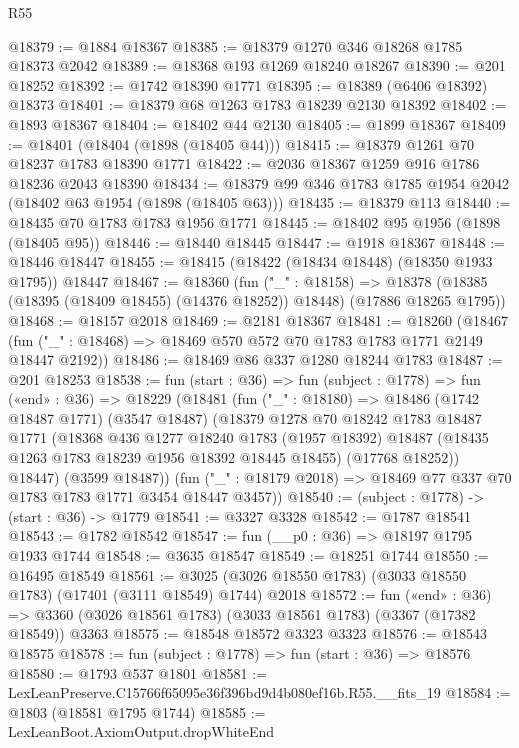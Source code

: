 \begin{lexlean}{R55}
\begin{coremodule}
@18379 := @1884 @18367
@18385 := @18379 @1270 @346 @18268 @1785 @18373 @2042
@18389 := @18368 @193 @1269 @18240 @18267
@18390 := @201 @18252
@18392 := @1742 @18390 @1771
@18395 := @18389 (@6406 @18392) @18373
@18401 := @18379 @68 @1263 @1783 @18239 @2130 @18392
@18402 := @1893 @18367
@18404 := @18402 @44 @2130
@18405 := @1899 @18367
@18409 := @18401 (@18404 (@1898 (@18405 @44)))
@18415 := @18379 @1261 @70 @18237 @1783 @18390 @1771
@18422 := @2036 @18367 @1259 @916 @1786 @18236 @2043 @18390
@18434 := @18379 @99 @346 @1783 @1785 @1954 @2042 (@18402 @63 @1954 (@1898 (@18405 @63)))
@18435 := @18379 @113
@18440 := @18435 @70 @1783 @1783 @1956 @1771
@18445 := @18402 @95 @1956 (@1898 (@18405 @95))
@18446 := @18440 @18445
@18447 := @1918 @18367
@18448 := @18446 @18447
@18455 := @18415 (@18422 (@18434 @18448) (@18350 @1933 @1795)) @18447
@18467 := @18360
    (fun ("_" : @18158) =>
    @18378 (@18385 (@18395 (@18409 @18455) (@14376 @18252)) @18448) (@17886 @18265 @1795))
@18468 := @18157 @2018
@18469 := @2181 @18367
@18481 := @18260
    (@18467 (fun ("_" : @18468) => @18469 @570 @572 @70 @1783 @1783 @1771 @2149 @18447 @2192))
@18486 := @18469 @86 @337 @1280 @18244 @1783
@18487 := @201 @18253
@18538 := fun (start : @36) =>
  fun (subject : @1778) =>
  fun («end» : @36) =>
  @18229
    (@18481
      (fun ("_" : @18180) =>
      @18486
        (@1742 @18487 @1771)
        (@3547 @18487)
        (@18379
          @1278
          @70
          @18242
          @1783
          @18487
          @1771
          (@18368
            @436
            @1277
            @18240
            @1783
            (@1957 @18392)
            @18487
            (@18435 @1263 @1783 @18239 @1956 @18392 @18445 @18455)
            (@17768 @18252))
          @18447)
        (@3599 @18487))
      (fun ("_" : @18179 @2018) => @18469 @77 @337 @70 @1783 @1783 @1771 @3454 @18447 @3457))
@18540 := (subject : @1778) -> (start : @36) -> @1779
@18541 := @3327 @3328
@18542 := @1787 @18541
@18543 := @1782 @18542
@18547 := fun (__p0 : @36) => @18197 @1795 @1933 @1744
@18548 := @3635 @18547
@18549 := @18251 @1744
@18550 := @16495 @18549
@18561 := @3025 (@3026 @18550 @1783) (@3033 @18550 @1783) (@17401 (@3111 @18549) @1744) @2018
@18572 := fun («end» : @36) =>
  @3360 (@3026 @18561 @1783) (@3033 @18561 @1783) (@3367 (@17382 @18549)) @3363
@18575 := @18548 @18572 @3323 @3323
@18576 := @18543 @18575
@18578 := fun (subject : @1778) => fun (start : @36) => @18576
@18580 := @1793 @537 @1801
@18581 := LexLeanPreserve.C15766f65095e36f396bd9d4b080ef16b.R55.__fits_19
@18584 := @1803 (@18581 @1795 @1744)
@18585 := LexLeanBoot.AxiomOutput.dropWhiteEnd

\end{coremodule}
\end{lexlean}
